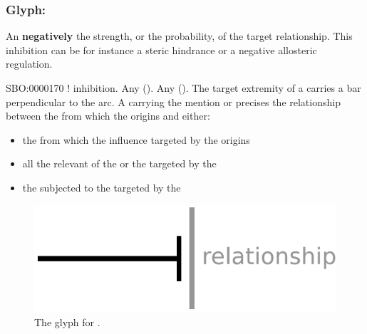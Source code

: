 
\subsubsection{Glyph: }\label{sec:inhibition}

An  \textbf{negatively}  the strength, or the probability, of the target relationship. This inhibition can be for instance a steric hindrance or a negative allosteric regulation.

\begin{glyphDescription}
 \glyphSboTerm SBO:0000170 ! inhibition.
 \glyphOrigin Any  ().
 \glyphTarget Any  ().
 \glyphEndPoint The target extremity of a  carries a bar perpendicular to the arc.
 \glyphAux A  carrying the mention  or  precises the relationship between the  from which the  origins and either:
\begin{itemize}
\item the  from which the influence targeted by the  origins
\item all the relevant  of the  or the  targeted by the 
\item the  subjected to the  targeted by the 
\end{itemize}
 \end{glyphDescription}

\begin{figure}[H]
  \centering
  \includegraphics[scale = 0.5]{images/inhibition}
  \caption{The \ER glyph for .}
  \label{fig:inhibition}
\end{figure}

